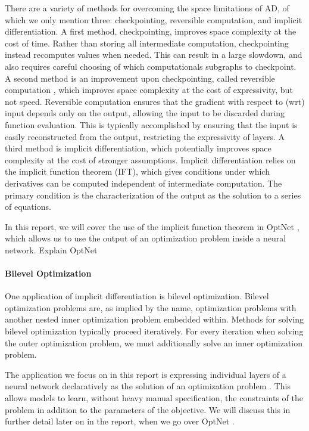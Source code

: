 \documentclass[11pt]{article}
\begin{document}
There are a variety of methods for overcoming the space limitations of AD,
of which we only mention three: checkpointing, reversible computation, and implicit differentiation.
A first method, checkpointing, improves space complexity at the cost of time.
Rather than storing all intermediate computation,
checkpointing instead recomputes values when needed.
This can result in a large slowdown,
and also requires careful choosing of which computationals subgraphs to checkpoint.
A second method is an improvement upon checkpointing, called reversible computation \citep{maclaurin2015reversible,gomez2017reversible},
which improves space complexity at the cost of expressivity, but not speed.
Reversible computation ensures that the gradient with respect to (wrt) input depends only on the output,
allowing the input to be discarded during function evaluation.
This is typically accomplished by ensuring that the input is easily reconstructed from the output,
restricting the expressivity of layers.
A third method is implicit differentiation,
which potentially improves space complexity at the cost of stronger assumptions.
Implicit differentiation relies on the implicit function theorem (IFT),
which gives conditions under which derivatives can be computed independent of
intermediate computation.
The primary condition is the characterization of the output as the solution
to a series of equations.

In this report, we will cover the use of the implicit function theorem
in OptNet \citep{optnet}, which allows us to use the output of an
optimization problem inside a neural network.
{\color{red} Explain OptNet}

\paragraph{Bilevel Optimization}
One application of implicit differentiation is bilevel optimization.
Bilevel optimization problems are, as implied by the name,
optimization problems with another nested inner optimization problem embedded within.
Methods for solving bilevel optimization typically proceed iteratively.
For every iteration when solving the outer optimization problem,
we must additionally solve an inner optimization problem.

The application we focus on in this report is expressing individual layers of a neural network declaratively
as the solution of an optimization problem \citep{optnet,agrawal2019diffcvx,gould2019declarative}.
This allows models to learn, without heavy manual specification, the constraints of the problem
in addition to the parameters of the objective.
We will discuss this in further detail later on in the report,
when we go over OptNet \citep{optnet}.
\end{document}
